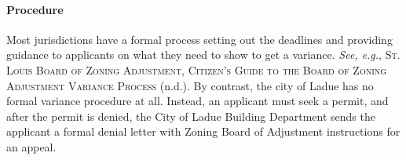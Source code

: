 \paragraph{Procedure} Most jurisdictions have a formal process setting out the
deadlines and providing guidance to applicants on what they need to show to get
a variance. \textit{See, e.g.}, \textsc{St. Louis Board of Zoning Adjustment,
Citizen's Guide to the Board of Zoning Adjustment Variance Process} (n.d.). By
contrast, the city of Ladue has no formal variance procedure at all. Instead, an
applicant must seek a permit, and after the permit is denied, the City of Ladue
Building Department sends the applicant a formal denial letter with Zoning Board
of Adjustment instructions for an appeal. 






